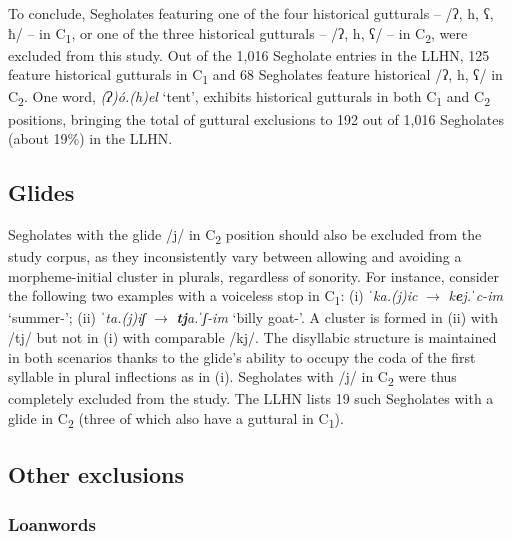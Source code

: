 To conclude, Segholates featuring one of the four historical gutturals -- /ʔ, h, ʕ, ħ/ -- in C\textsubscript{1}, or one of the three historical gutturals -- /ʔ, h, ʕ/ -- in C\textsubscript{2}, were excluded from this study. Out of the 1,016 Segholate entries in the LLHN, 125 feature historical gutturals in C\textsubscript{1} and 68 Segholates feature historical /ʔ, h, ʕ/ in C\textsubscript{2}. One word, \emph{(ʔ)ó.(h)el} `tent', exhibits historical gutturals in both C\textsubscript{1} and C\textsubscript{2} positions, bringing the total of guttural exclusions to 192 out of 1,016 Segholates (about 19\%) in the LLHN.

\subsection{Glides}\label{sec:c2glide}

Segholates with the glide /j/ in C\textsubscript{2} position should also be excluded from the study corpus, as they inconsistently vary between allowing and avoiding a morpheme-initial cluster in plurals, regardless of sonority. For instance, consider the following two examples with a voiceless stop in C\textsubscript{1}: (i) \emph{ˈka.(j)ic} \(\to\) \emph{k\textbf{e}j.ˈc-im} `summer-\Pl{}'; (ii) \emph{ˈta.(j)iʃ} \(\to\) \emph{\textbf{tj}a.ˈʃ-im} `billy goat-\Pl{}'. A cluster is formed in (ii) with /tj/ but not in (i) with comparable /kj/. The disyllabic structure is maintained in both scenarios thanks to the glide's ability to occupy the coda of the first syllable in plural inflections as in (i). Segholates with /j/ in C\textsubscript{2} were thus completely excluded from the study. The LLHN lists 19 such Segholates with a glide in C\textsubscript{2} (three of which also have a guttural in C\textsubscript{1}).

\subsection{Other exclusions}\label{sec:other}

\subsubsection{Loanwords}\label{loanwords}\largerpage

